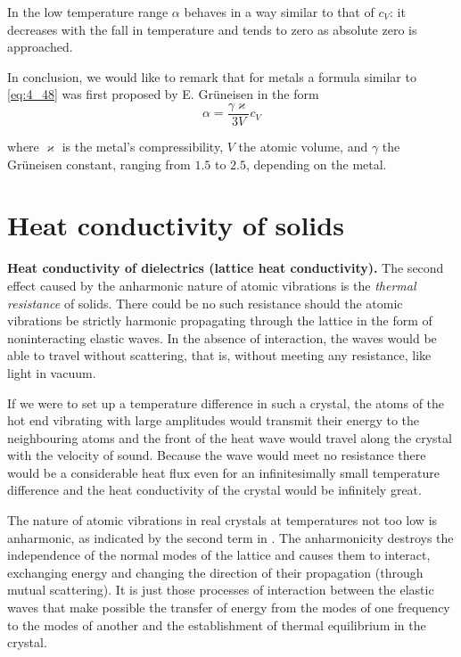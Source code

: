 In the low temperature range $\alpha$ behaves in a way similar to that of $c_V$: it decreases with the fall in temperature and tends to zero as absolute zero is approached.

In conclusion, we would like to remark that for metals a formula similar to \eqref{eq:4_48} was first proposed by E. Gr\"uneisen in the form
\begin{equation}\label{eq:4_50}
    \alpha = \frac{\gamma \varkappa}{3 V} c_V
\end{equation}

\noindent
where $\varkappa$ is the metal's compressibility, $V$ the atomic volume, and $\gamma$ the Gr\"uneisen constant, ranging from $1.5$ to $2.5$, depending on the metal.

\section{Heat conductivity of solids}\label{sec:36}

\textbf{Heat conductivity of dielectrics (lattice heat conductivity).} The second effect caused by the anharmonic nature of atomic vibrations is the \textit{thermal resistance} of solids. There could be no such resistance should the atomic vibrations be strictly harmonic propagating through the lattice in the form of noninteracting elastic waves. In
the absence of interaction, the waves would be able to travel without scattering, that is, without meeting any resistance, like light in vacuum.

If we were to set up a temperature difference in such a crystal, the atoms of the hot end vibrating with large amplitudes would transmit their energy to the neighbouring atoms and the front of the heat wave would travel along the crystal with the velocity of sound. Because the wave would meet no resistance there would be a considerable heat flux even for an infinitesimally small temperature difference and the heat conductivity of the crystal would be infinitely great.

The nature of atomic vibrations in real crystals at temperatures not too low is anharmonic, as indicated by the second term in . The anharmonicity destroys the independence of the normal modes of the lattice and causes them to interact, exchanging energy and changing the direction of their propagation (through mutual scattering). It is just those processes of interaction between the elastic waves that make possible the transfer of energy from the modes of one frequency to the modes of another and the establishment of thermal equilibrium in the crystal.

